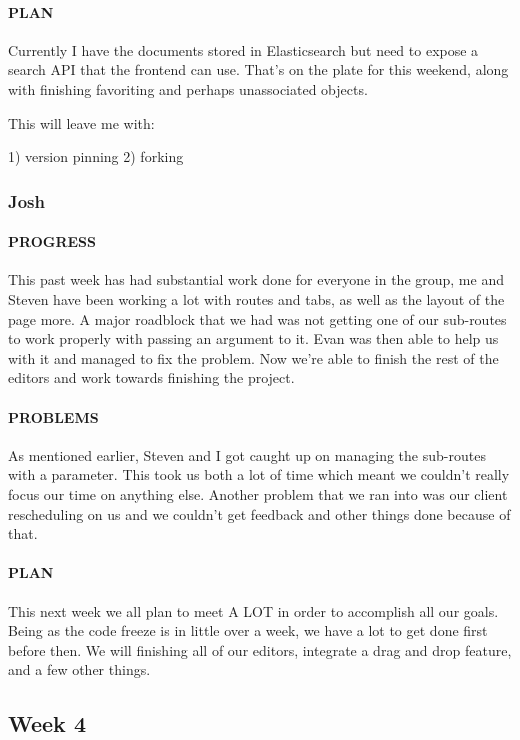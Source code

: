\documentclass[onecolumn, draftclsnofoot,10pt, compsoc]{IEEEtran}
\begin{document}
	\paragraph{PLAN}
	
	Currently I have the documents stored in Elasticsearch but need to expose a search API that the frontend can use. That's on the plate for this weekend, along with finishing favoriting and perhaps unassociated objects. 
	
	This will leave me with:
	
	1) version pinning
	2) forking
	
	\subsubsection{Josh}
	
	\paragraph{PROGRESS}
	This past week has had substantial work done for everyone in the group, me and Steven have been working a lot with routes and tabs, as well as the layout of the page more. A major roadblock that we had was not getting one of our sub-routes to work properly with passing an argument to it. Evan was then able to help us with it and managed to fix the problem. Now we're able to finish the rest of the editors and work towards finishing the project.
	
	\paragraph{PROBLEMS}
	As mentioned earlier, Steven and I got caught up on managing the sub-routes with a parameter. This took us both a lot of time which meant we couldn't really focus our time on anything else. Another problem that we ran into was our client rescheduling on us and we couldn't get feedback and other things done because of that. 
	
	\paragraph{PLAN}
	This next week we all plan to meet A LOT in order to accomplish all our goals. Being as the code freeze is in little over a week, we have a lot to get done first before then. We will finishing all of our editors, integrate a drag and drop feature, and a few other things.
\subsection{Week 4}
\end{document}
